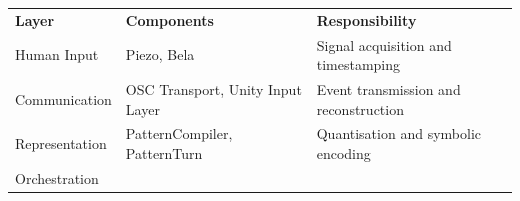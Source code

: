 {\def\LTcaptype{none} %
\begin{longtable}[]{@{}
  >{\raggedright\arraybackslash}p{}
  >{\raggedright\arraybackslash}p{}
  >{\raggedright\arraybackslash}p{}@{}}
\toprule\noalign{}
\begin{minipage}[b]{\linewidth}\centering
\textbf{Layer}
\end{minipage} & \begin{minipage}[b]{\linewidth}\centering
\textbf{Components}
\end{minipage} & \begin{minipage}[b]{\linewidth}\centering
\textbf{Responsibility}
\end{minipage} \\
\begin{minipage}[b]{\linewidth}\raggedright
Human Input
\end{minipage} & \begin{minipage}[b]{\linewidth}\raggedright
Piezo, Bela
\end{minipage} & \begin{minipage}[b]{\linewidth}\raggedright
Signal acquisition and timestamping
\end{minipage} \\
\begin{minipage}[b]{\linewidth}\raggedright
Communication
\end{minipage} & \begin{minipage}[b]{\linewidth}\raggedright
OSC Transport, Unity Input Layer
\end{minipage} & \begin{minipage}[b]{\linewidth}\raggedright
Event transmission and reconstruction
\end{minipage} \\
\begin{minipage}[b]{\linewidth}\raggedright
Representation
\end{minipage} & \begin{minipage}[b]{\linewidth}\raggedright
PatternCompiler, PatternTurn
\end{minipage} & \begin{minipage}[b]{\linewidth}\raggedright
Quantisation and symbolic encoding
\end{minipage} \\
\begin{minipage}[b]{\linewidth}\raggedright
Orchestration

\end{minipage}
\end{longtable}}
